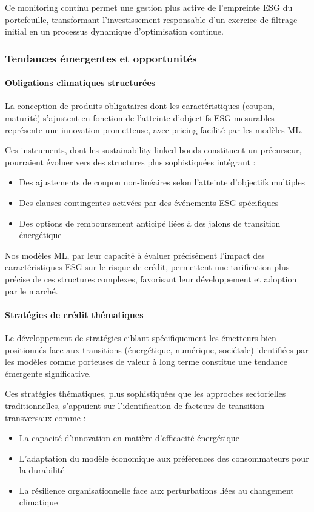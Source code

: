 Ce monitoring continu permet une gestion plus active de l'empreinte ESG du portefeuille, transformant l'investissement responsable d'un exercice de filtrage initial en un processus dynamique d'optimisation continue.

\subsubsection{Tendances émergentes et opportunités}

\paragraph{Obligations climatiques structurées}

La conception de produits obligataires dont les caractéristiques (coupon, maturité) s'ajustent en fonction de l'atteinte d'objectifs ESG mesurables représente une innovation prometteuse, avec pricing facilité par les modèles ML.

Ces instruments, dont les sustainability-linked bonds constituent un précurseur, pourraient évoluer vers des structures plus sophistiquées intégrant :
\begin{itemize}
    \item Des ajustements de coupon non-linéaires selon l'atteinte d'objectifs multiples
    \item Des clauses contingentes activées par des événements ESG spécifiques
    \item Des options de remboursement anticipé liées à des jalons de transition énergétique
\end{itemize}

Nos modèles ML, par leur capacité à évaluer précisément l'impact des caractéristiques ESG sur le risque de crédit, permettent une tarification plus précise de ces structures complexes, favorisant leur développement et adoption par le marché.

\paragraph{Stratégies de crédit thématiques}

Le développement de stratégies ciblant spécifiquement les émetteurs bien positionnés face aux transitions (énergétique, numérique, sociétale) identifiées par les modèles comme porteuses de valeur à long terme constitue une tendance émergente significative.

Ces stratégies thématiques, plus sophistiquées que les approches sectorielles traditionnelles, s'appuient sur l'identification de facteurs de transition transversaux comme :
\begin{itemize}
    \item La capacité d'innovation en matière d'efficacité énergétique
    \item L'adaptation du modèle économique aux préférences des consommateurs pour la durabilité
    \item La résilience organisationnelle face aux perturbations liées au changement climatique
\end{itemize}

